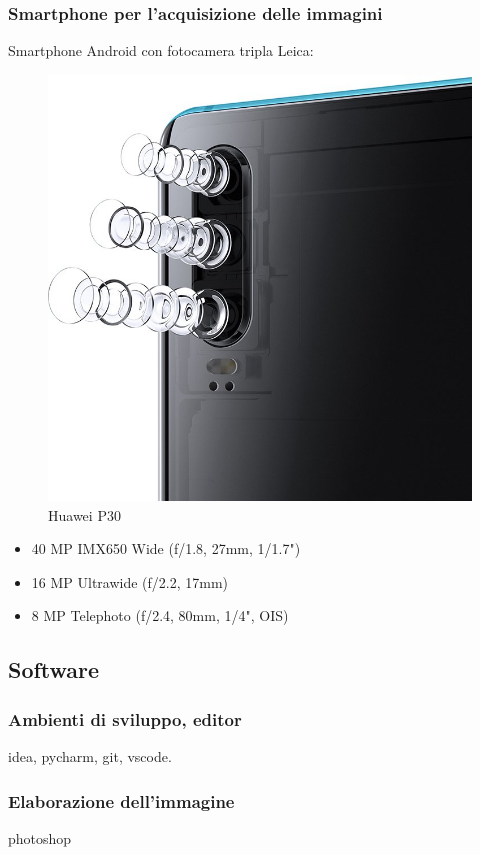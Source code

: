 \documentclass[twoside]{supsistudent}
\begin{document}
\subsubsection{Smartphone per l'acquisizione delle immagini}
Smartphone Android con fotocamera tripla Leica:
\begin{figure}[H]
  \center
  \includegraphics[scale=0.15]{images/smartphone.jpg}
  \caption{Huawei P30}
\end{figure}
\begin{itemize}
  \item 40 MP IMX650 Wide (f/1.8, 27mm, 1/1.7")
  \item 16 MP Ultrawide (f/2.2, 17mm)
  \item 8 MP Telephoto (f/2.4, 80mm, 1/4", OIS)
\end{itemize}
\subsection{Software}
\subsubsection{Ambienti di sviluppo, editor}
idea, pycharm, git, vscode.
\subsubsection{Elaborazione dell'immagine}
photoshop
\end{document}
